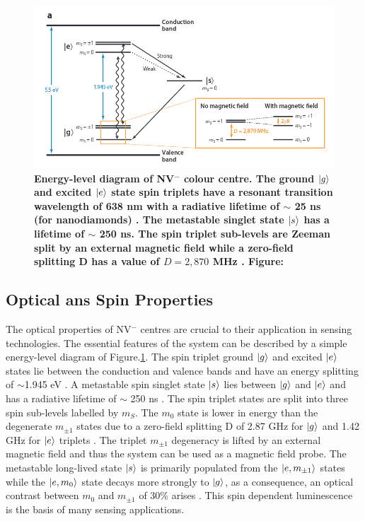 \documentclass[12pt]{article}
\begin{document}
\begin{figure}[h]
  \includegraphics[width=0.8\linewidth]{energy_level_diagram.png}
	  \caption{\textbf{Energy-level diagram of NV$^-$ colour centre. The ground $\ket{g}$ and excited $\ket{e}$ state spin triplets have a resonant transition wavelength of 638 nm with a radiative lifetime of $\sim$ 25 ns (for nanodiamonds) \cite{doherty2013nitrogen}. The metastable singlet state $\ket{s}$ has a lifetime of $\sim$ 250 ns. The spin triplet sub-levels are Zeeman split by an external magnetic field while a zero-field splitting D has a value of $D=2,870$ MHz \cite{schirhagl2014nitrogen,doherty2013nitrogen}. Figure:\cite{schirhagl2014nitrogen}}}
  \label{fig:energy_level}
\end{figure}


\subsection{Optical ans Spin Properties}
The optical properties of NV$^-$ centres are crucial to their application in sensing technologies. The essential features of the system can be described by a simple energy-level diagram of Figure.\ref{fig:energy_level}. The spin triplet ground $\ket{g}$ and excited $\ket{e}$ states lie between the conduction and valence bands and have an energy splitting of $\sim$1.945 eV \cite{schirhagl2014nitrogen}. A metastable spin singlet state $\ket{s}$ lies between $\ket{g}$ and $\ket{e}$ and has a radiative lifetime of $\sim$ 250 ns \cite{schirhagl2014nitrogen}. The spin triplet states are split into three spin sub-levels labelled by $m_S$. The $m_0$ state is lower in energy than the degenerate $m_{\pm1}$ states due to a zero-field splitting D of 2.87 GHz for $\ket{g}$ and 1.42 GHz for $\ket{e}$ triplets \cite{doherty2013nitrogen}. The triplet $m_{\pm1}$ degeneracy is lifted by an external magnetic field and thus the system can be used as a magnetic field probe. The metastable long-lived state $\ket{s}$ is primarily populated from the $\ket{e,m_{\pm1}}$ states while the $\ket{e,m_0}$ state decays more strongly to $\ket{g}$, as a consequence, an optical contrast between $m_0$ and $m_{\pm1}$ of 30\% arises \cite{schirhagl2014nitrogen}. This spin dependent luminescence is the basis of many sensing applications. 
\end{document}
